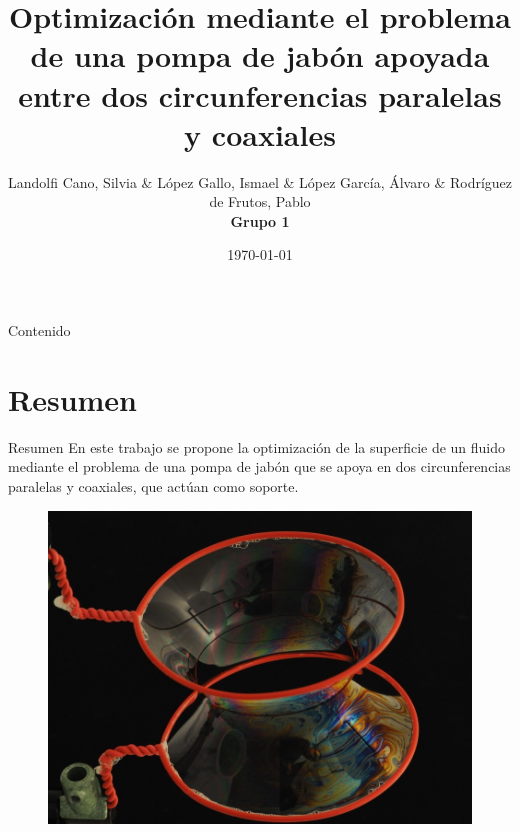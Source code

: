 \documentclass[11pt]{beamer}
\author[Grupo 1]{Landolfi Cano, Silvia \& López Gallo, Ismael \& López García, Álvaro \& Rodríguez de Frutos, Pablo \\ \textbf{Grupo 1}}
\title[Trabajo Optimización]{Optimización mediante el problema de una pompa de jabón apoyada entre dos circunferencias paralelas y coaxiales}
\date{\today}
\institute[CO]{
        Asignatura de Control y Optimización \\
        3$^{er}$ Curso de Grado en Ingeniería Aeroespacial, especialidad CTA \\
        Escuela Técnica Superior de Ingeniería Aeronáutica y del Espacio (UPM)
}
\begin{document}
	
	\begin{frame}
		\maketitle
	\end{frame}

	\begin{frame}{Contenido}
		\tableofcontents
	\end{frame}

	\section{Resumen}
		\begin{frame}{Resumen}
			\justifying
                En este trabajo se propone la optimización de la superficie de un fluido mediante el problema de una pompa de jabón que se apoya en dos circunferencias paralelas y coaxiales, que actúan como soporte.
                \begin{figure}
                    \centering
                    \includegraphics[width= 0.6 \textwidth, height=\textheight, keepaspectratio]{Figuras/soap_film.jpg}
                \end{figure}
		\end{frame}
	
\end{document}
